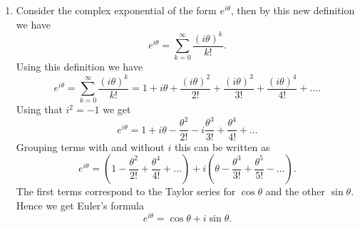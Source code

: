 \begin{enumerate}
\item Consider the complex exponential of the form $e^{i\theta}$, then by this new definition we have
$$e^{i\theta}=\sum_{k=0}^{\infty}\frac{(i\theta)^{k}}{k!}.$$
Using this definition we have
$$e^{i\theta}=\sum_{k=0}^{\infty}\frac{(i\theta)^{k}}{k!}=1+i\theta+\frac{(i\theta)^{2}}{2!}+\frac{(i\theta)^{3}}{3!}+\frac{(i\theta)^{4}}{4!}+\hdots.$$
Using that $i^{2}=-1$ we get
$$e^{i\theta}=1+i\theta-\frac{\theta^{2}}{2!}-i\frac{\theta^{3}}{3!}+\frac{\theta^{4}}{4!}+\hdots$$
Grouping terms with and without $i$ this can be written as
$$e^{i\theta}=(1-\frac{\theta^{2}}{2!}+\frac{\theta^{4}}{4!}+\hdots)+i(\theta-\frac{\theta^{3}}{3!}+\frac{\theta^{5}}{5!}-\hdots).$$
The first terms correspond to the Taylor series for $\cos \theta$ and the other $\sin \theta$. Hence we get Euler's formula
$$e^{i\theta}=\cos\theta+i\sin\theta.$$

\end{enumerate}